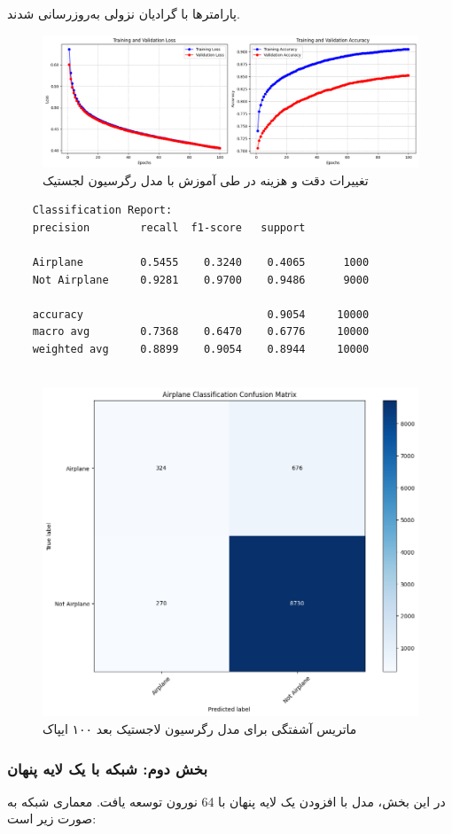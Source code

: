 	پارامترها با گرادیان نزولی به‌روزرسانی شدند.
	
\begin{figure}[h]
	\centering
	\includegraphics[width=0.7\linewidth]{images/task1-2}
	\caption{تغییرات دقت و هزینه در طی آموزش با مدل رگرسیون لجستیک}
	\label{fig:task1-1}
\end{figure}
\begin{lstlisting}
	Classification Report:
	precision        recall  f1-score   support
	
	Airplane         0.5455    0.3240    0.4065      1000
	Not Airplane     0.9281    0.9700    0.9486      9000
	
	accuracy                             0.9054     10000
	macro avg        0.7368    0.6470    0.6776     10000
	weighted avg     0.8899    0.9054    0.8944     10000
	
\end{lstlisting}

\begin{figure}[h]
	\centering
	\includegraphics[width=0.5\linewidth]{images/task1-3}
	\caption{ماتریس آشفتگی برای مدل رگرسیون لاجستیک بعد ۱۰۰ ایپاک}
	\label{fig:task1-3}
\end{figure}


	\subsubsection{بخش دوم: شبکه با یک لایه پنهان}
	
	در این بخش، مدل با افزودن یک لایه پنهان با 64 نورون توسعه یافت. معماری شبکه به صورت زیر است:
	
